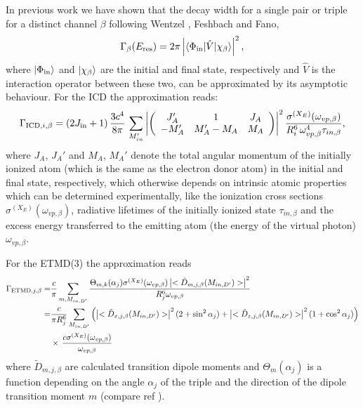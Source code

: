\documentclass[journal=jpccck,manuscript=article]{achemso}
\begin{document}
In previous work \cite{Fasshauer13,Fasshauer_thesis} we have shown that
the decay width for a single pair or triple for a distinct channel $\beta$
following Wentzel \cite{Wentzel27}, Feshbach\cite{Feshbach58,Feshbach62}
and Fano,\cite{Fano61}
%
\begin{equation}
 \Gamma_{\beta}(E_{\rm res}) = 2\pi \left|
                           \braket{\Phi_{\rm in}| \hat{V} |\chi_{\beta}}
                           \right|^2,
\end{equation}
%
where $\ket{\Phi_{\rm in}}$ and $\ket{\chi_{\beta}}$ are the initial and final
state, respectively and $\hat{V}$ is the interaction operator between these
two, can be approximated by its asymptotic behaviour.
For the ICD the approximation reads:
%
\begin{equation}
 \Gamma_{{\rm ICD},i,\beta} = (2J_{\rm in}+1)\, \frac{3c^4}{8\pi}\,
                        \sum\limits_{M_{in}'}
                        \left| \left(
                        \begin{array}{ccc}
                        J_A'  & 1        & J_A\\
                        -M_A' & M_A'-M_A & M_A
                        \end{array}\right) \right|^2
                        \frac{\sigma^{(X_E)}(\omega_{vp,\beta})}
                        {R_i^6 \, \omega_{vp,\beta}^4 \tau_{in,\beta}},
\end{equation}
%
where $J_A$, $J_A'$ and $M_A$, $M_A'$ denote the total angular momentum of the
initially ionized atom (which is the same as the electron donor atom) in the
initial and final state, respectively, which otherwise depends on
intrinsic atomic properties
which can be determined experimentally, like the ionization
cross sections
$\sigma^{(X_E)}(\omega_{vp,\beta})$, radiative lifetimes of the initially
ionized state $\tau_{in,\beta}$ and the excess energy transferred to the
emitting atom (the energy of the virtual photon) $\omega_{vp,\beta}$.

For the ETMD(3) the approximation reads
%
\begin{align}
 \Gamma_{{\rm ETMD},j,\beta} =& \frac{c}{\pi} \sum\limits_{m,M_{in,D'}}
                        \frac{\Theta_{m,k}(\alpha_j) \sigma^{(X_E)}(\omega_{vp,\beta})
                              \left| <\tilde{D}_{m,j,\beta}(M_{in,D'})>\right|^2}
                         {R_j^6 \omega_{vp,\beta}}\\
               =& \frac{c}{\pi R_j^6}
               \sum\limits_{M_{in,D'}}
               \left( \left| <\tilde{D}_{x,j,\beta} (M_{in,D'}) > \right|^2
                 (2+ \sin^2\alpha_j)
               + \left| <\tilde{D}_{z,j,\beta} (M_{in,D'}) > \right|^2
                 (1+\cos^2\alpha_j) \right) \nonumber \\
           & \times\, \frac{c\sigma^{(X_E)}(\omega_{vp,\beta})}{\omega_{vp,\beta}}
\end{align}
%
where $\tilde{D}_{m,j,\beta}$ are calculated transition dipole moments and
$\Theta_{m}(\alpha_j)$ is a function depending on the angle $\alpha_j$
of the triple and the direction of the dipole
transition moment $m$
(compare ref ).
\end{document}
